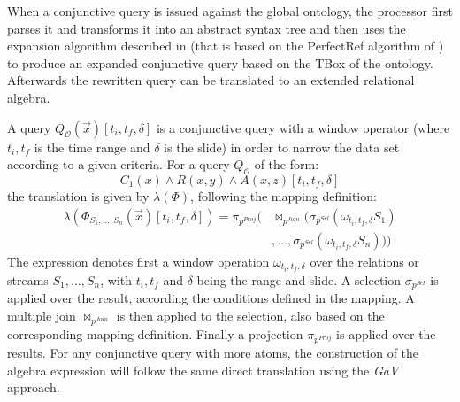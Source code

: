 When a conjunctive query is issued against the global ontology, the processor first parses it and transforms it into an
abstract syntax tree and then uses the expansion algorithm described in \cite{Barrasa_04} (that is based on the
\textsf{PerfectRef} algorithm of \cite{Calvanese_05}) to produce an expanded conjunctive query based on the TBox of the
ontology. Afterwards the rewritten query can be translated to an extended relational algebra.

A query $Q_{\mathcal{O}}(\vec{x})[t_i,t_f,\delta]$ is a conjunctive query with a window operator (where $t_i,t_f$ is
the time range and $\delta$ is the slide) in order to narrow the data set according to a given criteria. For a query
$Q_{\mathcal{O}}$ of the form:
\begin{equation*}
C_1(x) \wedge R(x,y) \wedge A(x,z) [t_i,t_f,\delta]
\end{equation*}
the translation is given by $\lambda(\Phi)$, following the mapping definition:
\begin{align*}
\lambda(\Phi_{S_1,\ldots,S_n}(\vec{x})[t_i,t_f,\delta])=\pi_{p^{Proj}}(& \Join_{p^{Join}}
(\sigma_{p^{Sel}}(\omega_{t_i,t_f,\delta}S_1) \\ 
& ,\dots,\sigma_{p^{Sel}}(\omega_{t_i,t_f,\delta}S_n)))
\end{align*}
The expression denotes first a window operation $\omega_{t_i,t_f,\delta}$ over the relations or streams $S_1,\dots
,S_n$, with $t_i,t_f$ and $\delta$ being the range and slide. A selection $\sigma_{p^{Sel}}$ is applied over the
result, according the conditions defined in the mapping.  A multiple join $\Join_{p^{Join}}$ is then applied to the
selection, also based on the corresponding mapping definition. Finally a projection $\pi_{p^{Proj}}$ is applied over
the results. For any conjunctive query with more atoms, the construction of the algebra expression will follow the same
direct translation using the \textit{GaV} approach.
%
